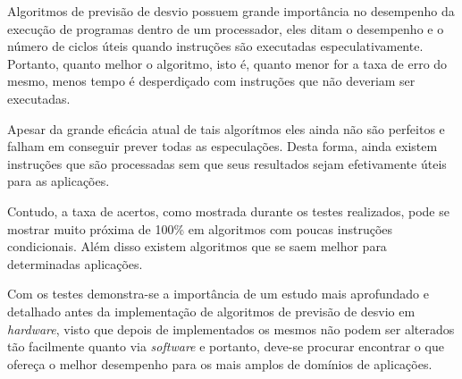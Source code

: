\documentclass[12pt]{article}
\begin{document}
Algoritmos de previsão de desvio possuem grande importância no desempenho da execução 
de programas dentro de um processador, eles ditam o desempenho e o número de ciclos úteis quando
instruções são executadas especulativamente. Portanto, quanto melhor o algoritmo, isto é, quanto menor for 
a taxa de erro do mesmo, menos tempo é desperdiçado com instruções que não deveriam ser executadas.

Apesar da grande eficácia atual de tais algorítmos eles ainda não são perfeitos e falham em conseguir 
prever todas as especulações. Desta forma, ainda existem instruções que são processadas sem que seus
resultados sejam efetivamente úteis para as aplicações.

Contudo, a taxa de acertos, como mostrada durante os testes realizados, pode se mostrar muito próxima de 100\% em algoritmos com poucas instruções
condicionais. Além disso existem algoritmos que se saem melhor para determinadas aplicações. 

Com os testes demonstra-se a importância de um estudo mais aprofundado e detalhado antes da implementação de algoritmos de previsão de desvio em \textit{hardware},
visto que depois de implementados os mesmos não podem ser alterados tão facilmente quanto via \textit{software} e portanto, deve-se procurar encontrar o que ofereça 
o melhor desempenho para os mais amplos de domínios de aplicações.



\end{document}
